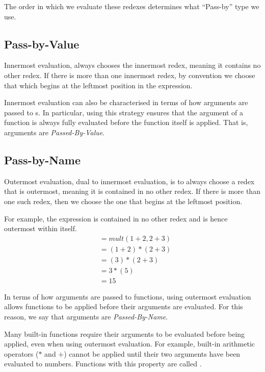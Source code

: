 The order in which we evaluate these redexes determines what ``Pass-by'' type we use.

\subsection{Pass-by-Value}\label{subsec:Pass_by_Value}
Innermost evaluation, always chooses the innermost redex, meaning it contains no other redex.
If there is more than one innermost redex, by convention we choose that which begins at the leftmost position in the expression.

Innermost evaluation can also be characterised in terms of how arguments are passed to s.
In particular, using this strategy ensures that the argument of a function is always fully evaluated before the function itself is applied.
That is, arguments are \emph{Passed-By-Value}.

\subsection{Pass-by-Name}\label{subsec:Pass_by_Name}
Outermost evaluation, dual to innermost evaluation, is to always choose a redex that is outermost, meaning it is contained in no other redex.
If there is more than one such redex, then we choose the one that begins at the leftmost position.

For example, the expression  is contained in no other redex and is hence outermost within itself.
\begin{align*}
  &= mult(1+2, 2+3) \\
  &= (1+2) * (2+3) \\
  &= (3) * (2+3) \\
  &= 3 * (5) \\
  &= 15
\end{align*}

In terms of how arguments are passed to functions, using outermost evaluation allows functions to be applied before their arguments are evaluated.
For this reason, we say that arguments are \emph{Passed-By-Name}.

\begin{remark*}
  Many built-in functions require their arguments to be evaluated before being applied, even when using outermost evaluation.
  For example, built-in arithmetic operators ($*$ and $+$) cannot be applied until their two arguments have been evaluated to numbers.
  Functions with this property are called .
\end{remark*}


